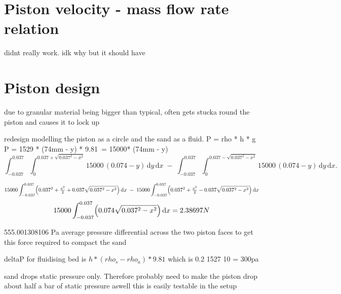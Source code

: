 \section{Piston velocity - mass flow rate relation}
didnt really work. idk why but it should have
\section{Piston design}
due to granular material being bigger than typical, often gets stucka round the piston and causes it to lock up

redesign
modelling the piston as a circle and the sand as a fluid. 
P = rho * h * g
P = 1529 * (74mm - y) * 9.81~= 15000* (74mm - y)
\begin{equation}
    \int_{-0.037}^{0.037}\!\int_{0}^{0.037+\sqrt{0.037^2 - x^2}}15000\,(0.074 - y)\,\mathrm{d}y\,\mathrm{d}x
    \;-\;
    \int_{-0.037}^{0.037}\!\int_{0}^{0.037-\sqrt{0.037^2 - x^2}}15000\,(0.074 - y)\,\mathrm{d}y\,\mathrm{d}x.
\end{equation}

\begin{equation}
    15000\int_{-0.037}^{0.037}\Bigl(0.037^2 + \tfrac{x^2}{2} + 0.037\sqrt{0.037^2 - x^2}\Bigr)\,\mathrm{d}x
    \;-\;
    15000\int_{-0.037}^{0.037}\Bigl(0.037^2 + \tfrac{x^2}{2} - 0.037\sqrt{0.037^2 - x^2}\Bigr)\,\mathrm{d}x
\end{equation}
\begin{equation}
    15000\int_{-0.037}^{0.037}\Bigl(0.074\sqrt{0.037^2 - x^2}\Bigr)\,\mathrm{d}x = 2.38697N
\end{equation}

555.001308106 Pa average pressure differential across the two piston faces to get this force required to compact the sand

deltaP for fluidising bed is $h*(rho_s - rho_a)*9.81$ which is 0.2 1527 10 = 300pa


sand drops static pressure only. Therefore probably need to make the piston drop about half a bar of static pressure aswell
this is easily testable in the setup

